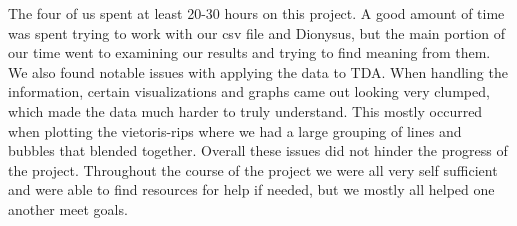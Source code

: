 \documentclass[12pt]{report}
\begin{document}
The four of us spent at least 20-30 hours on this project. A good amount of time was spent trying to work with our csv file and Dionysus, but the main portion of our time went to examining our results and trying to find meaning from them. We also found notable issues with applying the data to TDA. When handling the information, certain visualizations and graphs came out looking very clumped, which made the data much harder to truly understand. This mostly occurred when plotting the vietoris-rips where we had a large grouping of lines and bubbles that blended together. Overall these issues did not hinder the progress of the project. Throughout the course of the project we were all very self sufficient and were able to find resources for help if needed, but we mostly all helped one another meet goals.

\clearpage
\end{document}

